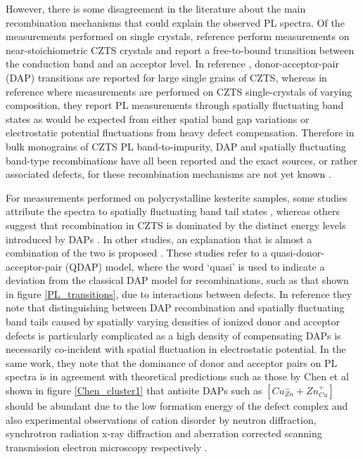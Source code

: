 However, there is some disagreement in the literature about the main recombination mechanisms that could explain the observed PL spectra. Of the measurements performed on single crystals, reference  perform measurements on near-stoichiometric CZTS crystals and report a free-to-bound transition between the conduction band and an acceptor level. In reference , donor-acceptor-pair (DAP) transitions are reported for large single grains of CZTS, whereas in reference  where measurements are performed on CZTS single-crystals of varying composition, they report PL measurements through spatially fluctuating band states as would be expected from either spatial band gap variations or electrostatic potential fluctuations from heavy defect compensation. Therefore in bulk monograins of CZTS PL band-to-impurity, DAP and spatially fluctuating band-type recombinations have all been reported and the exact sources, or rather associated defects, for these recombination mechanisms are not yet known \cite{Gershon_ref18}.

For measurements performed on polycrystalline kesterite samples, some studies attribute the spectra to spatially fluctuating band tail states \cite{Romero}, whereas others suggest that recombination in CZTS is dominated by the distinct energy levels introduced by DAPs \cite{Unold, Miyamoto}. In other studies, an explanation that is almost a combination of the two is proposed \cite{Gershon, Gershon_ref18}. These studies refer to a quasi-donor-acceptor-pair (QDAP) model, where the word `quasi' is used to indicate a deviation from the classical DAP model for recombinations, such as that shown in figure \ref{PL_transitions}, due to interactions between defects. In reference  they note that distinguishing between DAP recombination and spatially fluctuating band tails caused by spatially varying densities of ionized donor and acceptor defects is particularly complicated as a high density of compensating DAPs is necessarily co-incident with spatial fluctuation in electrostatic potential. In the same work, they note that the dominance of donor and acceptor pairs on PL spectra is in agreement with theoretical predictions such as those by Chen et al shown in figure \ref{Chen_cluster1} \cite{defect1} that antisite DAPs such as $[Cu_{Zn}^{-} + Zn_{Cu}^{+}]$ should be abundant due to the low formation energy of the defect complex and also experimental observations of cation disorder by neutron diffraction, synchrotron radiation x-ray diffraction and aberration corrected scanning transmission electron microscopy respectively \cite{Schorr, CZTS_Xray, CZTS_TEM}.

